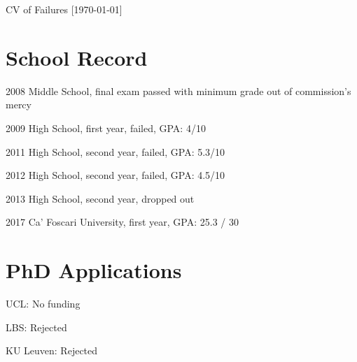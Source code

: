 \documentclass[11pt,a4paper]{article}
\begin{document}
\date{}
\thispagestyle{empty}
\setlength\cvlabelwidth{90pt}

\begin{cv}{\huge CV of Failures \large{[\today ]}}


\section{School Record}

\begin{cvlist}{}
	\item[2008] Middle School, final exam passed with minimum grade out of commission's mercy
	\item[2009] High School, first year,  failed, GPA: 4/10
	\item[2011] High School, second year,  failed, GPA: 5.3/10
	\item[2012] High School, second year,  failed, GPA: 4.5/10
	\item[2013] High School, second year,  dropped out
	\item[2017] Ca' Foscari University, first year,  GPA: 25.3 / 30
\end{cvlist}

\section{PhD Applications }

\begin{cvlist}{}
	\item[UCL: ] No funding
	\item[LBS: ] Rejected
	\item[KU Leuven: ] Rejected
\end{cvlist}


\end{cv}
\end{document}
